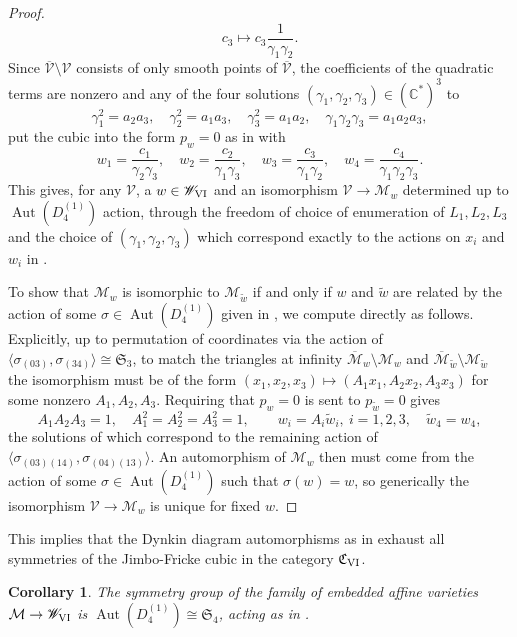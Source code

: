 \documentclass[a4paper,reqno]{amsart}
\numberwithin{equation}{section}
\DeclareMathOperator{\Aut}{Aut}
\newtheorem{corollary}[theorem]{Corollary}
\numberwithin{equation}{section}
\begin{document}
\begin{proof}
\begin{equation*}
    c_3\mapsto c_3 \frac{1}{\gamma_1\gamma_2}.
\end{equation*}
Since $\overline{\mathcal{V}}\setminus \mathcal{V}$ consists of only smooth points of $\overline{\mathcal{V}}$, the coefficients of the quadratic terms are nonzero and any of the four solutions $(\gamma_1,\gamma_2,\gamma_3)\in(\mathbb{C}^*)^3$ to
$$\gamma_1^2 = a_2 a_3, \quad \gamma_2^2 = a_1 a_3, \quad \gamma_3^2 = a_1 a_2,\quad \gamma_1\gamma_2\gamma_3=a_1a_2a_3,$$
put the cubic into the form 
$p_w=0$ as in  
with 
$$w_1 = \frac{c_1}{\gamma_2\gamma_3}, \quad 
w_2 = \frac{c_2}{\gamma_1\gamma_3}, \quad 
w_3 = \frac{c_3}{\gamma_1\gamma_2}, \quad 
w_4 = \frac{c_4}{\gamma_1\gamma_2 \gamma_3}.$$
This gives, for any $\mathcal{V}$, a $w \in \mathscr{W}_{\rm VI}$ and an isomorphism $\mathcal{V}\to \mathcal{M}_w$ determined up to $\Aut(D_4^{(1)})$ action, through the freedom of choice of enumeration of $L_1,L_2,L_3$ and the choice of $(\gamma_1,\gamma_2,\gamma_3)$ which correspond exactly to the actions on $x_i$ and $w_i$ in .

To show that $\mathcal{M}_w$ is isomorphic to $\mathcal{M}_{\tilde{w}}$ if and only if $w$ and $\tilde{w}$ are related by the action of some $\sigma\in \Aut(D_4^{(1)})$ given in , we compute directly as follows. 
Explicitly, up to permutation of coordinates via the action of $\langle \sigma_{(03)},\sigma_{(34)}\rangle \cong \mathfrak{S}_3$, to match the triangles at infinity $\overline{\mathcal{M}}_{w}\setminus \mathcal{M}_{w}$ and $\overline{\mathcal{M}}_{\tilde{w}}\setminus \mathcal{M}_{\tilde{w}}$ the isomorphism must be of the form $(x_1,x_2,x_3)\mapsto (A_1 x_1,A_2 x_2, A_3x_3)$ for some nonzero $A_1,A_2,A_3$. Requiring that $p_{w}=0$ is sent to $p_{\tilde{w}}=0$ gives 
\begin{equation*}
    A_1A_2A_3=1,\quad A_1^2=A_2^2=A_3^2=1, \qquad w_i = A_i \tilde{w}_i, ~i=1,2,3,\quad \tilde{w}_4=w_4, 
\end{equation*}
the solutions of which correspond to the remaining action of $\langle \sigma_{(03)(14)}, \sigma_{(04)(13)}\rangle$.
An automorphism of $\mathcal{M}_w$ then must come from the action of some $\sigma \in \Aut(D_4^{(1)})$ such that $\sigma(w)=w$, so generically the isomorphism $\mathcal{V}\to \mathcal{M}_w$ is unique for fixed $w$.
\end{proof}

 
This implies that the Dynkin diagram automorphisms as in  exhaust all symmetries of the Jimbo-Fricke cubic in the category $\mathfrak{C}_{\rm VI}$.
\begin{corollary}
    The symmetry group of the family of embedded affine varieties $\mathcal{M}\to\mathscr{W}_{\rm{VI}}$ is $\Aut(D_4^{(1)})\cong\mathfrak{S}_4$, acting as in .
\end{corollary}
\end{document}
